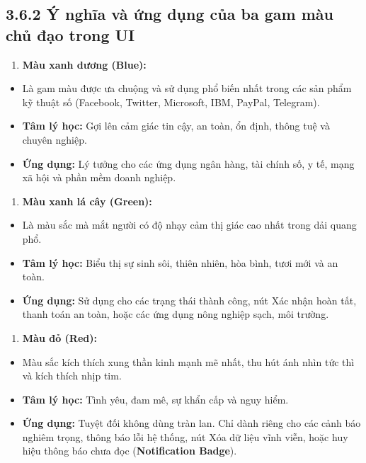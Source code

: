 \documentclass[11pt,a4paper,oneside]{report}
\begin{document}
\subsection{3.6.2 Ý nghĩa và ứng dụng của ba gam màu chủ đạo trong UI}
\begin{enumerate}[leftmargin=1.5em]
\item \textbf{Màu xanh dương (Blue):}
\end{enumerate}
\begin{itemize}[leftmargin=1.5em]
\item Là gam màu được ưa chuộng và sử dụng phổ biến nhất trong các sản phẩm kỹ thuật số (Facebook, Twitter, Microsoft, IBM, PayPal, Telegram).
\item \textbf{Tâm lý học:} Gợi lên cảm giác tin cậy, an toàn, ổn định, thông tuệ và chuyên nghiệp.
\item \textbf{Ứng dụng:} Lý tưởng cho các ứng dụng ngân hàng, tài chính số, y tế, mạng xã hội và phần mềm doanh nghiệp.
\end{itemize}
\begin{enumerate}[leftmargin=1.5em]
\item \textbf{Màu xanh lá cây (Green):}
\end{enumerate}
\begin{itemize}[leftmargin=1.5em]
\item Là màu sắc mà mắt người có độ nhạy cảm thị giác cao nhất trong dải quang phổ.
\item \textbf{Tâm lý học:} Biểu thị sự sinh sôi, thiên nhiên, hòa bình, tươi mới và an toàn.
\item \textbf{Ứng dụng:} Sử dụng cho các trạng thái thành công, nút Xác nhận hoàn tất, thanh toán an toàn, hoặc các ứng dụng nông nghiệp sạch, môi trường.
\end{itemize}
\begin{enumerate}[leftmargin=1.5em]
\item \textbf{Màu đỏ (Red):}
\end{enumerate}
\begin{itemize}[leftmargin=1.5em]
\item Màu sắc kích thích xung thần kinh mạnh mẽ nhất, thu hút ánh nhìn tức thì và kích thích nhịp tim.
\item \textbf{Tâm lý học:} Tình yêu, đam mê, sự khẩn cấp và nguy hiểm.
\item \textbf{Ứng dụng:} Tuyệt đối không dùng tràn lan. Chỉ dành riêng cho các cảnh báo nghiêm trọng, thông báo lỗi hệ thống, nút Xóa dữ liệu vĩnh viễn, hoặc huy hiệu thông báo chưa đọc (\textbf{Notification Badge}).
\end{itemize}
\end{document}
